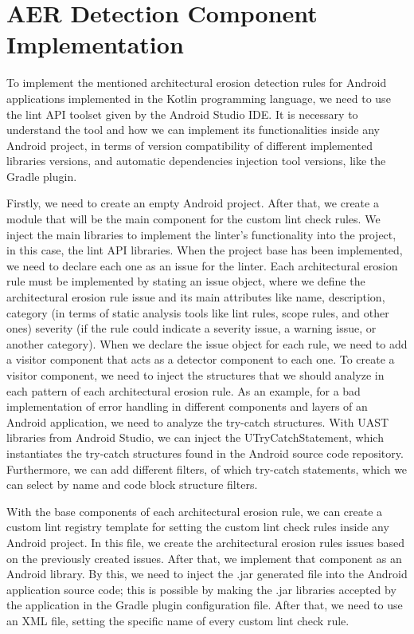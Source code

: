 \section{AER Detection Component Implementation}
To implement the mentioned architectural erosion detection rules for Android applications implemented in the Kotlin programming language, we need to use the lint API toolset given by the Android Studio IDE. It is necessary to understand the tool and how we can implement its functionalities inside any Android project, in terms of version compatibility of different implemented libraries versions, and automatic dependencies injection tool versions, like the Gradle plugin. 

Firstly, we need to create an empty Android project. After that, we create a module that will be the main component for the custom lint check rules. We inject the main libraries to implement the linter's functionality into the project, in this case, the lint API libraries. When the project base has been implemented, we need to declare each one as an issue for the linter. Each architectural erosion rule must be implemented by stating an issue object, where we define the architectural erosion rule issue and its main attributes like name, description, category (in terms of static analysis tools like lint rules, scope rules, and other ones) severity (if the rule could indicate a severity issue, a warning issue, or another category). When we declare the issue object for each rule, we need to add a visitor component that acts as a detector component to each one. To create a visitor component, we need to inject the structures that we should analyze in each pattern of each architectural erosion rule. As an example, for a bad implementation of error handling in different components and layers of an Android application, we need to analyze the try-catch structures. With UAST libraries from Android Studio, we can inject the UTryCatchStatement, which instantiates the try-catch structures found in the Android source code repository. Furthermore, we can add different filters, of which try-catch statements, which we can select by name and code block structure filters.

With the base components of each architectural erosion rule, we can create a custom lint registry template for setting the custom lint check rules inside any Android project. In this file, we create the architectural erosion rules issues based on the previously created issues. After that, we implement that component as an Android library. By this, we need to inject the .jar generated file into the Android application source code; this is possible by making the .jar libraries accepted by the application in the Gradle plugin configuration file.  After that, we need to use an XML file, setting the specific name of every custom lint check rule.

